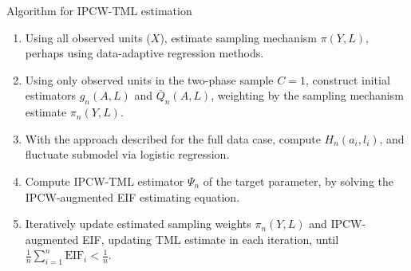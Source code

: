 \documentclass{beamer}
\begin{document}
\begin{frame}[c]{Algorithm for IPCW-TML estimation}

\begin{center}
\begin{enumerate}\label{ipcwtmle_algo}
  \itemsep8pt
  \item Using all observed units ($X$), estimate sampling mechanism
    $\pi(Y, L)$, perhaps using data-adaptive regression methods.
  \item Using only observed units in the two-phase sample $C = 1$,
    construct initial estimators $g_n(A,L)$ and $\overline{Q}_n(A,L)$,
    weighting by the sampling mechanism estimate $\pi_n(Y,L)$.
  \item With the approach described for the full data case, compute
    $H_n(a_i,l_i)$, and fluctuate submodel via logistic regression.
  \item Compute IPCW-TML estimator $\Psi_n$ of the target parameter, by solving
    the IPCW-augmented EIF estimating equation.
  \item Iteratively update estimated sampling weights $\pi_n(Y,L)$ and
    IPCW-augmented EIF, updating TML estimate in each iteration, until
    $\frac{1}{n}\sum_{i = 1}^n \text{EIF}_i < \frac{1}{n}$.
\end{enumerate}
\end{center}


\end{frame}

\end{document}
